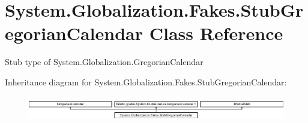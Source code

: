 \hypertarget{class_system_1_1_globalization_1_1_fakes_1_1_stub_gregorian_calendar}{\section{System.\-Globalization.\-Fakes.\-Stub\-Gregorian\-Calendar Class Reference}
\label{class_system_1_1_globalization_1_1_fakes_1_1_stub_gregorian_calendar}
}


Stub type of System.\-Globalization.\-Gregorian\-Calendar 


Inheritance diagram for System.\-Globalization.\-Fakes.\-Stub\-Gregorian\-Calendar\-:\begin{figure}[H]
\begin{center}
\leavevmode
\includegraphics[height=1.101278cm]{class_system_1_1_globalization_1_1_fakes_1_1_stub_gregorian_calendar}
\end{center}
\end{figure}
